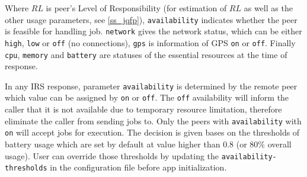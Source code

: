 \documentclass[conference]{IEEEtran}
\begin{document}
\begin{figure}
\noindent {}	
\noindent {}	

\label{code:jsonResponse}

\end{figure}

Where $RL$ is peer's Level of Responsibility (for estimation of $RL$ as well as the other usage parameters, see \ref{ss_jqfp}), \texttt{availability} indicates whether the peer is feasible for handling job. \texttt{network} gives the network status, which can be either \texttt{high}, \texttt{low} or \texttt{off} (no connections), \texttt{gps} is information of GPS \texttt{on} or \texttt{off}. Finally \texttt{cpu}, \texttt{memory} and \texttt{battery} are statuses of the essential resources at the time of response. 

In any IRS response, parameter \texttt{availability} is determined by the remote peer which value can be assigned by \texttt{on} or \texttt{off}. The \texttt{off} availability will inform the caller that it is not available due to temporary resource limitation, therefore eliminate the caller from sending jobs to. Only the peers with \texttt{availability} with \texttt{on} will accept jobs for execution. The decision is given bases on the thresholds of battery usage which are set by default at value higher than 0.8 (or 80\% overall usage). User can override those thresholds by updating the \texttt{availability-thresholds} in the configuration file before app initialization. 
\end{document}
